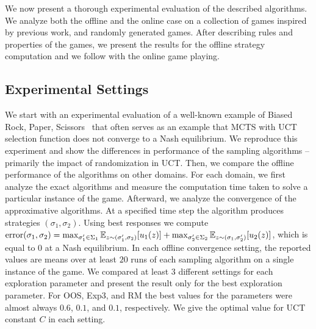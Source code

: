 
We now present a thorough experimental evaluation of the described algorithms.
We analyze both the offline and the online case on a collection of games inspired by previous work, and randomly generated games.
After describing rules and properties of the games, we present the results for the offline strategy computation and we follow with the online game playing.

\subsection{Experimental Settings}

We start with an experimental evaluation of a well-known example of Biased Rock, Paper, Scissors~\cite{Shafiei09} that often serves
as an example that MCTS with UCT selection function does not converge to a Nash equilibrium.
We reproduce this experiment and show the differences in performance of the sampling algorithms -- primarily the impact of randomization in UCT.
Then, we compare the offline performance of the algorithms on other domains.
For each domain, we first analyze the exact algorithms and measure the computation time taken to solve a particular instance of the game.
Afterward, we analyze the convergence of the approximative algorithms.
At a specified time step the algorithm produces strategies $(\sigma_1,\sigma_2)$. Using best responses we compute
$\textrm{error}(\sigma_1,\sigma_2) = \max_{\sigma_1' \in \Sigma_1} \mathbb{E}_{z \sim (\sigma_1',\sigma_2)}[u_1(z)]
                                   + \max_{\sigma_2' \in \Sigma_2} \mathbb{E}_{z \sim (\sigma_1,\sigma_2')}[u_2(z)]$,
which is equal to $0$ at a Nash equilibrium.
In each offline convergence setting, the reported values are means over at least $20$ runs of each sampling algorithm on a single instance of the game.
We compared at least $3$ different settings for each exploration parameter and present the result only for the best exploration parameter.
For OOS, Exp3, and RM the best values for the parameters were almost always $0.6$, $0.1$, and $0.1$, respectively.
We give the optimal value for UCT constant $C$ in each setting. 

